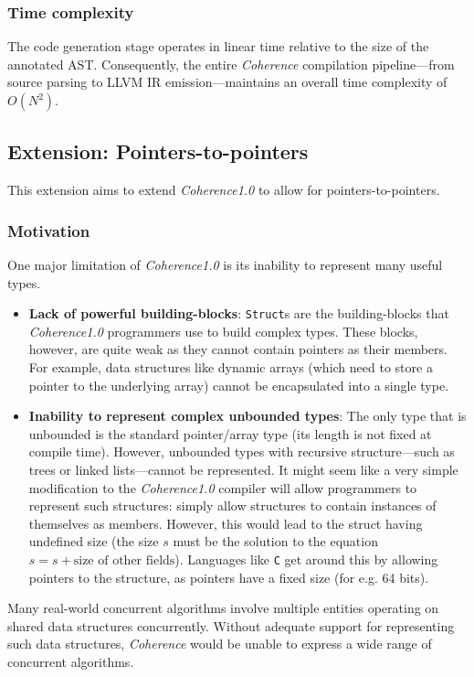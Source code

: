 \documentclass[a4paper,12pt,fleqn]{article}
\begin{document}
\subsubsection{Time complexity}
The code generation stage operates in linear time relative to the size of the annotated AST. Consequently, the entire \textit{Coherence} compilation pipeline---from source parsing to LLVM IR emission---maintains an overall time complexity of $O(N^2)$.

\subsection{Extension: Pointers-to-pointers} \label{sec:pointers-to-pointers}
This extension aims to extend \textit{Coherence1.0} to allow for pointers-to-pointers.
\subsubsection{Motivation}
One major limitation of \textit{Coherence1.0} is its inability to represent many useful types.
\begin{itemize}
  \item \textbf{Lack of powerful building-blocks}: \texttt{Struct}s are the building-blocks that \textit{Coherence1.0} programmers use to build complex types. These blocks, however, are quite weak as they cannot contain pointers as their members. For example, data structures like dynamic arrays (which need to store a pointer to the underlying array) cannot be encapsulated into a single type.
  \item \textbf{Inability to represent complex unbounded types}: The only type that is unbounded is the standard pointer/array type (its length is not fixed at compile time). However, unbounded types with recursive structure—such as trees or linked lists—cannot be represented. It might seem like a very simple modification to the \textit{Coherence1.0} compiler will allow programmers to represent such structures: simply allow structures to contain instances of themselves as members. However, this would lead to the struct having undefined size (the size $s$ must be the solution to the equation $s = s + \text{size of other fields}$). Languages like \texttt{C} get around this by allowing pointers to the structure, as pointers have a fixed size (for e.g. 64 bits).
\end{itemize} 
Many real-world concurrent algorithms involve multiple entities operating on shared data structures concurrently. Without adequate support for representing such data structures, \textit{Coherence} would be unable to express a wide range of concurrent algorithms.
\end{document}

